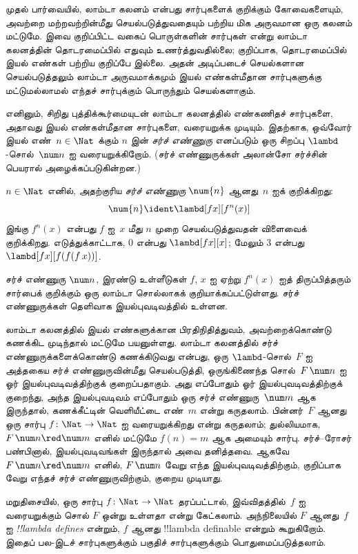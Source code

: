 \documentclass[../../../include/open-logic-section]{subfiles}
\begin{document}

முதல் பார்வையில், லாம்டா கலனம் என்பது சார்புகளைக் குறிக்கும் கோவைகளையும்,
அவற்றை மற்றவற்றின்மீது செயல்படுத்துவதையும் பற்றிய மிக அருவமான ஒரு கலனம்
மட்டுமே. இவை குறிப்பிட்ட வகைப் பொருள்களின் சார்புகள் என்று லாம்டா கலனத்தின்
தொடரமைப்பில் எதுவும் உணர்த்துவதில்லை; குறிப்பாக, தொடரமைப்பில் இயல் எண்கள்
பற்றிய குறிப்பே இல்லை. அதன் அடிப்படைச் செயல்களான செயல்படுத்தலும் லாம்டா
அருவமாக்கமும் இயல் எண்கள்மீதான சார்புகளுக்கு மட்டுமல்லாமல் எந்தச்
சார்புக்கும் பொருந்தும் செயல்களாகும்.

எனினும், சிறிது புத்திக்கூர்மையுடன் லாம்டா கலனத்தில் எண்கணிதச் சார்புகளை,
அதாவது இயல் எண்கள்மீதான சார்புகளை, வரையறுக்க முடியும். இதற்காக, ஒவ்வோர் இயல்
எண்~$n \in \Nat$ க்கும் $n$ இன் \emph{சர்ச் எண்ணுரு} எனப்படும் ஒரு சிறப்பு
$\lambd$-சொல்~$\num n$ ஐ வரையறுக்கிறோம். (சர்ச் எண்ணுருக்கள் அலான்சோ சர்ச்சின்
பெயரால் அழைக்கப்படுகின்றன.)

\begin{defn}
  $n \in \Nat$ எனில், அதற்குரிய \emph{சர்ச் எண்ணுரு} $\num{n}$ ஆனது~$n$ ஐக்
  குறிக்கிறது:
  \[
    \num{n} \ident \lambd[fx][f^n(x)]
  \]
  இங்கு $f^n(x)$ என்பது $f$ ஐ~$x$ மீது $n$ முறை செயல்படுத்துவதன் விளைவைக்
  குறிக்கிறது. எடுத்துக்காட்டாக, $\num{0}$ என்பது $\lambd[fx][x]$; மேலும்
  $\num{3}$ என்பது $\lambd[fx][f(f(f\,x))]$.
\end{defn}

சர்ச் எண்ணுரு $\num n$, இரண்டு உள்ளீடுகள் $f$, $x$ ஐ ஏற்று $f^n(x)$ ஐத்
திருப்பித்தரும் சார்பைக் குறிக்கும் ஒரு லாம்டா சொல்லாகக் குறியாக்கப்பட்டுள்ளது.
சர்ச் எண்ணுருக்கள் தெளிவாக இயல்புவடிவத்தில் உள்ளன.

லாம்டா கலனத்தில் இயல் எண்களுக்கான பிரதிநிதித்துவம், அவற்றைக்கொண்டு கணக்கிட
முடிந்தால் மட்டுமே பயனுள்ளது. லாம்டா கலனத்தில் சர்ச் எண்ணுருக்களைக்கொண்டு
கணக்கிடுவது என்பது, ஒரு $\lambd$-சொல்~$F$ ஐ அத்தகைய சர்ச் எண்ணுருவின்மீது
செயல்படுத்தி, ஒருங்கிணைந்த சொல்~$F\, \num n$ ஐ ஓர் இயல்புவடிவத்திற்குக்
குறைப்பதாகும். அது எப்போதும் ஓர் இயல்புவடிவத்திற்குக் குறைந்து, அந்த
இயல்புவடிவம் எப்போதும் ஒரு சர்ச் எண்ணுரு~$\num m$ ஆக இருந்தால், கணக்கீட்டின்
வெளியீட்டை எண்~$m$ என்று கருதலாம். பின்னர்~$F$ ஆனது ஒரு சார்பு
$f\colon \Nat \to \Nat$ ஐ வரையறுக்கிறது என்று கருதலாம்; துல்லியமாக,
$F\, \num n \red \num m$ எனில் மட்டுமே $f(n) = m$ ஆக அமையும் சார்பு.
சர்ச்--ரோசர் பண்பினால், இயல்புவடிவங்கள் இருந்தால் அவை தனித்தவை. ஆகவே
$F\, \num n \red \num m$ எனில், $F \, \num n$ வேறு எந்த
இயல்புவடிவத்திற்கும், குறிப்பாக வேறு எந்தச் சர்ச் எண்ணுருவிற்கும், குறைய
முடியாது.

மறுதிசையில், ஒரு சார்பு $f\colon \Nat \to \Nat$ தரப்பட்டால், இவ்விதத்தில்~$f$
ஐ வரையறுக்கும் சொல் $F$ ஒன்று உள்ளதா என்று கேட்கலாம். அந்நிலையில் $F$ ஆனது~$f$
ஐ \emph{!!{lambda define}s} என்றும், $f$ ஆனது !!{lambda definable} என்றும்
கூறுகிறோம். இதைப் பல-இடச் சார்புகளுக்கும் பகுதிச் சார்புகளுக்கும்
பொதுமைப்படுத்தலாம்.
\end{document}
